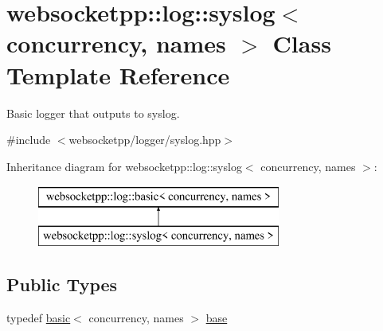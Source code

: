 \hypertarget{classwebsocketpp_1_1log_1_1syslog}{}\section{websocketpp\+:\+:log\+:\+:syslog$<$ concurrency, names $>$ Class Template Reference}
\label{classwebsocketpp_1_1log_1_1syslog}


Basic logger that outputs to syslog.  




{\ttfamily \#include $<$websocketpp/logger/syslog.\+hpp$>$}

Inheritance diagram for websocketpp\+:\+:log\+:\+:syslog$<$ concurrency, names $>$\+:\begin{figure}[H]
\begin{center}
\leavevmode
\includegraphics[height=2.000000cm]{classwebsocketpp_1_1log_1_1syslog}
\end{center}
\end{figure}
\subsection*{Public Types}
\begin{DoxyCompactItemize}
\item 
typedef \hyperlink{classwebsocketpp_1_1log_1_1basic}{basic}$<$ concurrency, names $>$ \hyperlink{classwebsocketpp_1_1log_1_1syslog_af8dc65e20aafdace6b41c36983e6401f}{base}
\end{DoxyCompactItemize}
